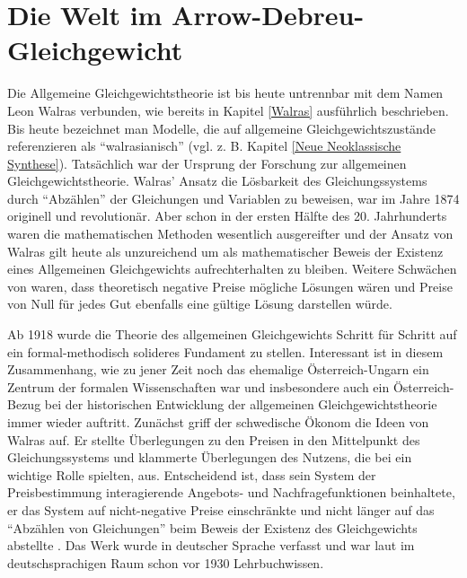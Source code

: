 \section{Die Welt im Arrow-Debreu-Gleichgewicht}
\label{Arrow-Debreu}

Die Allgemeine Gleichgewichtstheorie ist bis heute untrennbar mit dem Namen Leon Walras verbunden, wie bereits in Kapitel \ref{Walras} ausführlich beschrieben. Bis heute bezeichnet man Modelle, die auf allgemeine Gleichgewichtszustände referenzieren als "`walrasianisch"' (vgl. z. B. Kapitel \ref{Neue Neoklassische Synthese}). Tatsächlich war \textcite{Walras1874} der Ursprung der Forschung zur allgemeinen Gleichgewichtstheorie. Walras' Ansatz die Lösbarkeit des Gleichungssystems durch "`Abzählen"' der Gleichungen und Variablen zu beweisen, war im Jahre 1874 originell und revolutionär. Aber schon in der ersten Hälfte des 20. Jahrhunderts waren die mathematischen Methoden wesentlich ausgereifter und der Ansatz von Walras gilt heute als unzureichend um als mathematischer Beweis der Existenz eines Allgemeinen Gleichgewichts aufrechterhalten zu bleiben. Weitere Schwächen von \textcite{Walras1874} waren, dass theoretisch negative Preise mögliche Lösungen wären und Preise von Null für jedes Gut ebenfalls eine gültige Lösung darstellen würde.

Ab 1918 wurde die Theorie des allgemeinen Gleichgewichts Schritt für Schritt auf ein formal-methodisch solideres Fundament zu stellen. Interessant ist in diesem Zusammenhang, wie zu jener Zeit noch das ehemalige Österreich-Ungarn ein Zentrum der formalen Wissenschaften war und insbesondere auch ein Österreich-Bezug bei der historischen Entwicklung der allgemeinen Gleichgewichtstheorie immer wieder auftritt. Zunächst griff der schwedische Ökonom \textcite{Cassel1918} die Ideen von Walras auf. Er stellte Überlegungen zu den Preisen in den Mittelpunkt des Gleichungssystems und klammerte Überlegungen des Nutzens, die bei \textcite{Walras1874} ein wichtige Rolle spielten, aus. Entscheidend ist, dass sein System der Preisbestimmung interagierende Angebots- und Nachfragefunktionen beinhaltete, er das System auf nicht-negative Preise einschränkte und nicht länger auf das "`Abzählen von Gleichungen"' beim Beweis der Existenz des Gleichgewichts abstellte \parencite[S. 4]{Weintraub1983}. Das Werk \textcite{Cassel1918} wurde in deutscher Sprache verfasst und war laut \textcite[S. 4]{Weintraub1983} im deutschsprachigen Raum schon vor 1930 Lehrbuchwissen. 


